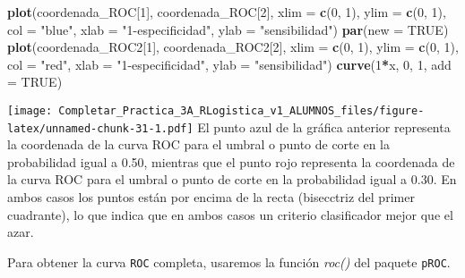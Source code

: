 \documentclass[
]{article}
\newenvironment{Shaded}{\begin{snugshade}}{\end{snugshade}}
\newcommand{\AttributeTok}[1]{\textcolor[rgb]{0.13,0.29,0.53}{#1}}
\newcommand{\ConstantTok}[1]{\textcolor[rgb]{0.56,0.35,0.01}{#1}}
\newcommand{\DecValTok}[1]{\textcolor[rgb]{0.00,0.00,0.81}{#1}}
\newcommand{\FunctionTok}[1]{\textcolor[rgb]{0.13,0.29,0.53}{\textbf{#1}}}
\newcommand{\NormalTok}[1]{#1}
\newcommand{\SpecialCharTok}[1]{\textcolor[rgb]{0.81,0.36,0.00}{\textbf{#1}}}
\newcommand{\StringTok}[1]{\textcolor[rgb]{0.31,0.60,0.02}{#1}}
\begin{document}
\begin{Shaded}
\begin{Highlighting}[]
\FunctionTok{plot}\NormalTok{(coordenada\_ROC[}\DecValTok{1}\NormalTok{], coordenada\_ROC[}\DecValTok{2}\NormalTok{], }\AttributeTok{xlim =} \FunctionTok{c}\NormalTok{(}\DecValTok{0}\NormalTok{, }\DecValTok{1}\NormalTok{), }\AttributeTok{ylim =} \FunctionTok{c}\NormalTok{(}\DecValTok{0}\NormalTok{, }\DecValTok{1}\NormalTok{), }
     \AttributeTok{col =} \StringTok{"blue"}\NormalTok{, }\AttributeTok{xlab =} \StringTok{"1{-}especificidad"}\NormalTok{, }\AttributeTok{ylab =} \StringTok{"sensibilidad"}\NormalTok{)}
\FunctionTok{par}\NormalTok{(}\AttributeTok{new =} \ConstantTok{TRUE}\NormalTok{)}
\FunctionTok{plot}\NormalTok{(coordenada\_ROC2[}\DecValTok{1}\NormalTok{], coordenada\_ROC2[}\DecValTok{2}\NormalTok{], }\AttributeTok{xlim =} \FunctionTok{c}\NormalTok{(}\DecValTok{0}\NormalTok{, }\DecValTok{1}\NormalTok{), }\AttributeTok{ylim =} \FunctionTok{c}\NormalTok{(}\DecValTok{0}\NormalTok{, }\DecValTok{1}\NormalTok{), }
     \AttributeTok{col =} \StringTok{"red"}\NormalTok{, }\AttributeTok{xlab =} \StringTok{"1{-}especificidad"}\NormalTok{, }\AttributeTok{ylab =} \StringTok{"sensibilidad"}\NormalTok{)}
\FunctionTok{curve}\NormalTok{(}\DecValTok{1}\SpecialCharTok{*}\NormalTok{x, }\DecValTok{0}\NormalTok{, }\DecValTok{1}\NormalTok{, }\AttributeTok{add =} \ConstantTok{TRUE}\NormalTok{)}
\end{Highlighting}
\end{Shaded}

\texttt{[image: Completar\_Practica\_3A\_RLogistica\_v1\_ALUMNOS\_files/figure-latex/unnamed-chunk-31-1.pdf]}
El punto azul de la gráfica anterior representa la coordenada de la
curva ROC para el umbral o punto de corte en la probabilidad igual a
0.50, mientras que el punto rojo representa la coordenada de la curva
ROC para el umbral o punto de corte en la probabilidad igual a 0.30. En
ambos casos los puntos están por encima de la recta (bisecctriz del
primer cuadrante), lo que indica que en ambos casos un criterio
clasificador mejor que el azar.

Para obtener la curva \texttt{ROC} completa, usaremos la función
\emph{roc()} del paquete \texttt{pROC}.

\begin{Shaded}
\end{Shaded}
\end{document}
